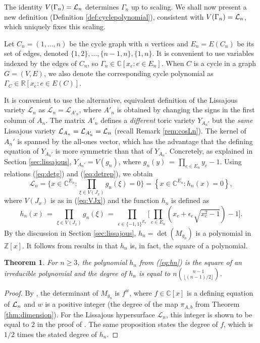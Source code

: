 \documentclass[a4paper, 11pt, twoside]{article}
\newcommand{\C}{\mathbb{C}}
\newcommand{\R}{\mathbb{R}}
\newcommand{\ML}{{\mathcal L}}
\newcommand{\Z}{\mathbb Z}
\theoremstyle{plain}
\newtheorem{theorem}{Theorem}[section]
\begin{document}
The identity $V(\Gamma_n) = {\cal L}_n$ determines $\Gamma_n$ up to scaling. We shall now present a new definition (Definition \ref{def:cyclepolynomial}), consistent with $V(\Gamma_n) = {\cal L}_n$, which uniquely fixes this scaling. 

Let $C_n=(1,\ldots,n)$ be the cycle graph with $n$ vertices and $E_n=E(C_n)$ be its set of edges, denoted $\{1,2\}, \ldots, \{n-1,n\}, \{1,n\}$. It is convenient to use variables indexed by the edges of  $C_n$, so $\Gamma_n\in \C[x_e:e\in E_n]$. When $C$ is a cycle in a graph $G=(V,E)$, we also denote the corresponding cycle polynomial as $\Gamma_C\in \R[x_e: e\in E(C)]$.  

It is convenient  to use the alternative, equivalent definition of the Lissajous variety $\ML_n$ as $\ML_n=\ML_{A'_n}$,
where $A'_n$ is obtained by changing the signs in the first column of $A_n$. 
The matrix $A'_n$ defines a \emph{different} toric variety $Y_{A_n'}$ but the \emph{same} Lissajous variety ${\cal L}_{A_n} = {\cal L}_{A_n'} = {\cal L}_n$ (recall Remark \ref{rem:cosLn}). 
The kernel of $A_n'$ is spanned by the all-ones vector, which has the advantage that    the defining equation of $Y_{A_n'}$ is more symmetric than that of $Y_{A_n}$. Concretely, as explained in Section \ref{sec:lissajous}, $Y_{A_n'}=V(g_n)$, where  $g_n(y) \, = \, \prod_{e\in E_n} y_e - 1$. 
Using relations (\ref{eq:detg}) and  (\ref{eq:detrep}), we obtain 
\[
\ML_n=\Big \{x\in\C^{E_n}: \prod_{\xi\in V(J_x)} g_n(\xi)=0\Big \}=\left\{x\in \C^{E_n}: h_n(x)=0\right\},
\]
where $V(J_x)$ is as in (\ref{eq:VJx}) and   the function $h_n$ is defined as 
\begin{equation}\label{eq:hn}
h_n(x) \,  = \, \prod_{\xi \in V(J_x)} g_n(\xi) \, = \, \prod_{\epsilon \in \{-1,1\}^{E_n}} \Big[ \prod_{e \in E_n} (x_e + \epsilon_e \sqrt{x_e^2-1} ) - 1 \Big].
\end{equation}
By the discussion in Section \ref{sec:lissajous},  $h_n=\det(M_{g_n})$ is a polynomial in $\Z[x]$.
It follows from results in \cite{mascarin2025lissajousvarieties} that  $h_n$ is, in fact, the square of a polynomial.

\begin{theorem} \label{lem:existence}
    For $n \geq 3$, the polynomial  $h_n$ from (\ref{eq:hn}) 
    is the square of an irreducible polynomial and the  degree of $h_n$  is equal to
   $n \binom{n-1}{\lfloor (n-1)/2 \rfloor}$.
\end{theorem}

\begin{proof}
By \cite[Proposition 3.5]{mascarin2025lissajousvarieties}, the determinant of $M_{g_n}$ is $f^w$, where $f\in\C[x]$ is a defining equation of ${\cal L}_n$ and $w$ is a positive integer (the degree of the map $\pi_{A,b}$ from Theorem \ref{thm:dimension}). For the  Lissajous hypersurface $\ML_n$, this integer is shown to be equal to $2$ in the proof of \cite[Proposition 2.6]{mascarin2025lissajousvarieties}. The same proposition states the degree of $f$, which is $1/2$ times the stated degree of $h_n$. 
\end{proof}
\end{document}
